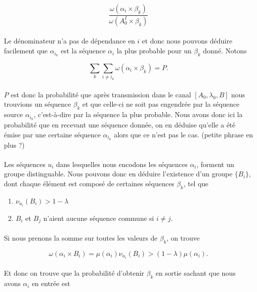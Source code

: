 	\[\frac{\omega(\alpha_i \times \beta_k)}{\omega(A_0^I \times \beta_k)}\]
	
	\paragraph{}
	Le dénominateur n'a pas de dépendance en $i$ et donc nous pouvons déduire facilement que $\alpha_{i_k}$ est la séquence $\alpha_i$ la plus probable pour un $\beta_k$ donné.
	Notons
	
	\[\sum_k\sum_{i\neq i_k}\omega(\alpha_i \times \beta_k) = P.\]
	
	\paragraph{}
	$P$ est donc la probabilité que après transmission dans le canal $[A_0,\lambda_0,B]$ nous trouvions un séquence $\beta_k$ et que celle-ci ne soit pas engendrée par 
	la séquence source $\alpha_{i_k}$, c'est-à-dire par la séquence la plus probable. Nous avons donc ici la probabilité que en recevant une séquence donnée, on en déduise
	qu'elle a été émise par une certaine séquence $\alpha_{i_k}$ alors que ce n'est pas le cas. (petite phrase en plus ?)
	
	\paragraph{}
	Les séquences $u_i$ dans lesquelles nous encodons les séquences $\alpha_i$, forment un groupe distinguable. Nous pouvons donc en déduire l'existence d'un groupe $\{B_i\}$, dont 
	chaque élément est composé de certaines séquences $\beta_k$, tel que 
	\begin{enumerate}
		\item $\nu_{u_i}(B_i) > 1-\lambda$
		\item $B_i$ et $B_j$ n'aient aucune séquence commune si $i\neq j$.
	\end{enumerate}
	
	\paragraph{}Si nous prenons la somme sur toutes les valeurs de $\beta_k$, on trouve
	
	\[\omega(\alpha_i \times B_i)=\mu(\alpha_i)\nu_{u_i}(B_i)>(1-\lambda)\mu(\alpha_i).\]
	
	\paragraph{}
	Et donc on trouve que la probabilité d'obtenir $\beta_k$ en sortie sachant que nous avons $\alpha_i$ en entrée est
	
